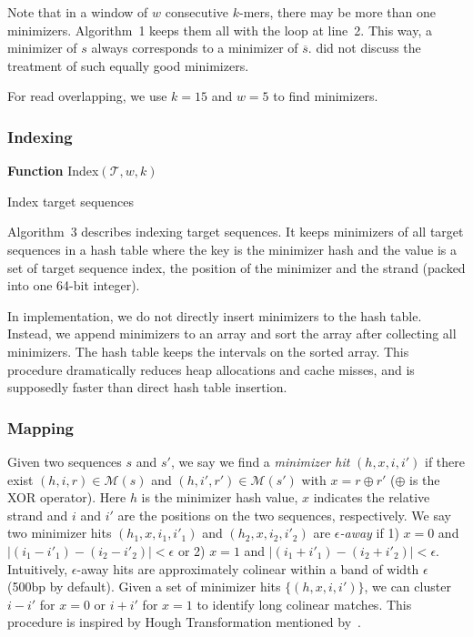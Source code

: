 \documentclass{bioinfo}
\begin{document}
\begin{methods}
Note that in a window of $w$ consecutive $k$-mers, there may be more than one
minimizers. Algorithm~1 keeps them all with the loop at line~2. This way, a
minimizer of $s$ always corresponds to a minimizer of $\overline{s}$.
\citet{Roberts:2004fv} did not discuss the treatment of such equally good
minimizers.

For read overlapping, we use $k=15$ and $w=5$ to find minimizers.

\subsubsection{Indexing}

\begin{algorithm}[tb]
\DontPrintSemicolon
\footnotesize
{}
\BlankLine
\textbf{Function} {\sc Index}$(\mathcal{T},w,k)$
\caption{Index target sequences}
\end{algorithm}

Algorithm~3 describes indexing target sequences. It keeps minimizers of all target
sequences in a hash table where the key is the minimizer hash and the value is
a set of target sequence index, the position of the minimizer and the strand
(packed into one 64-bit integer).

In implementation, we do not directly insert minimizers to the hash table.
Instead, we append minimizers to an array and sort the array after collecting
all minimizers. The hash table keeps the intervals on the sorted array. This
procedure dramatically reduces heap allocations and cache misses, and is
supposedly faster than direct hash table insertion.

\subsubsection{Mapping}

Given two sequences $s$ and $s'$, we say we find a \emph{minimizer hit}
$(h,x,i,i')$ if there exist $(h,i,r)\in\mathcal{M}(s)$ and
$(h,i',r')\in\mathcal{M}(s')$ with $x=r\oplus r'$ ($\oplus$ is the XOR
operator). Here $h$ is the minimizer hash value, $x$ indicates the relative
strand and $i$ and $i'$ are the positions on the two sequences, respectively.
We say two minimizer hits $(h_1,x,i_1,i'_1)$ and $(h_2,x,i_2,i'_2)$ are
\emph{$\epsilon$-away} if 1) $x=0$ and $|(i_1-i'_1)-(i_2-i'_2)|<\epsilon$
or 2) $x=1$ and $|(i_1+i'_1)-(i_2+i'_2)|<\epsilon$. Intuitively,
$\epsilon$-away hits are approximately colinear within a band of width
$\epsilon$ (500bp by default).  Given a set of minimizer hits $\{(h,x,i,i')\}$, we can cluster
$i-i'$ for $x=0$ or $i+i'$ for $x=1$ to identify long colinear matches.
This procedure is inspired by Hough Transformation mentioned
by~\citet{sovic:2015aa}. 


\end{methods}
\end{document}
